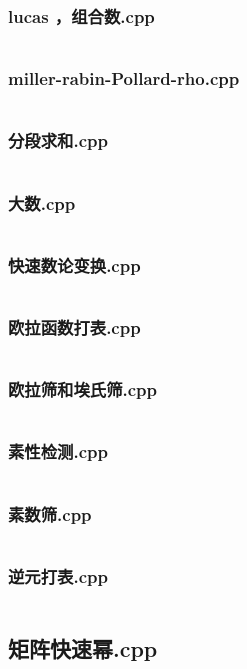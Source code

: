 \documentclass[a4paper,11pt]{article}
\begin{document}
\subsubsection{lucas ，组合数.cpp}
\inputminted{c++}{"D:/tmplz/templates/数学/数论/lucas ，组合数.cpp"}
\subsubsection{miller-rabin-Pollard-rho.cpp}
\inputminted{c++}{"D:/tmplz/templates/数学/数论/miller-rabin-Pollard-rho.cpp"}
\subsubsection{分段求和.cpp}
\inputminted{c++}{"D:/tmplz/templates/数学/数论/分段求和.cpp"}
\subsubsection{大数.cpp}
\inputminted{c++}{"D:/tmplz/templates/数学/数论/大数.cpp"}
\subsubsection{快速数论变换.cpp}
\inputminted{c++}{"D:/tmplz/templates/数学/数论/快速数论变换.cpp"}
\subsubsection{欧拉函数打表.cpp}
\inputminted{c++}{"D:/tmplz/templates/数学/数论/欧拉函数打表.cpp"}
\subsubsection{欧拉筛和埃氏筛.cpp}
\inputminted{c++}{"D:/tmplz/templates/数学/数论/欧拉筛和埃氏筛.cpp"}
\subsubsection{素性检测.cpp}
\inputminted{c++}{"D:/tmplz/templates/数学/数论/素性检测.cpp"}
\subsubsection{素数筛.cpp}
\inputminted{c++}{"D:/tmplz/templates/数学/数论/素数筛.cpp"}
\subsubsection{逆元打表.cpp}
\inputminted{c++}{"D:/tmplz/templates/数学/数论/逆元打表.cpp"}
\subsection{矩阵快速幂.cpp}
\inputminted{c++}{"D:/tmplz/templates/数学/矩阵快速幂.cpp"}
\end{document}
